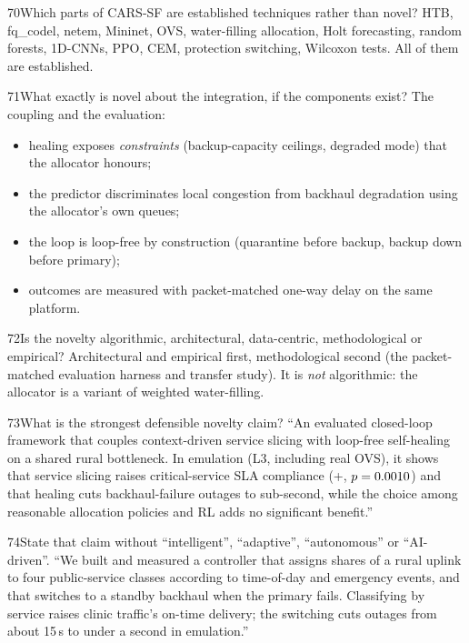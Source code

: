\begin{qa}{70}{Which parts of CARS-SF are established techniques rather than novel?}
HTB, fq\_codel, netem, Mininet, OVS, water-filling allocation, Holt forecasting, random forests, 1D-CNNs, PPO, CEM,
protection switching, Wilcoxon tests. All of them are established.
\end{qa}

\begin{qa}{71}{What exactly is novel about the integration, if the components exist?}
The coupling and the evaluation:
\begin{itemize}
\item healing exposes \emph{constraints} (backup-capacity ceilings, degraded mode) that the allocator honours;
\item the predictor discriminates local congestion from backhaul degradation using the allocator's own queues;
\item the loop is loop-free by construction (quarantine before backup, backup down before primary);
\item outcomes are measured with packet-matched one-way delay on the same platform.
\end{itemize}
\end{qa}

\begin{qa}{72}{Is the novelty algorithmic, architectural, data-centric, methodological or empirical?}
Architectural and empirical first, methodological second (the packet-matched evaluation harness and transfer study).
It is \emph{not} algorithmic: the allocator is a variant of weighted water-filling.
\end{qa}

\begin{qa}{73}{What is the strongest defensible novelty claim?}
``An evaluated closed-loop framework that couples context-driven service slicing with loop-free self-healing on a
shared rural bottleneck. In emulation (L3, including real OVS), it shows that service slicing raises critical-service
SLA compliance (+\NSlaDeltaNoSlicing, $p=0.0010$) and that healing cuts backhaul-failure outages to
sub-second, while the choice among reasonable allocation policies and RL adds no significant benefit.''
\end{qa}

\begin{qa}{74}{State that claim without ``intelligent'', ``adaptive'', ``autonomous'' or ``AI-driven''.}
``We built and measured a controller that assigns shares of a rural uplink to four public-service classes according
to time-of-day and emergency events, and that switches to a standby backhaul when the primary fails. Classifying by
service raises clinic traffic's on-time delivery; the switching cuts outages from about 15\,s to under a second in
emulation.''
\end{qa}

